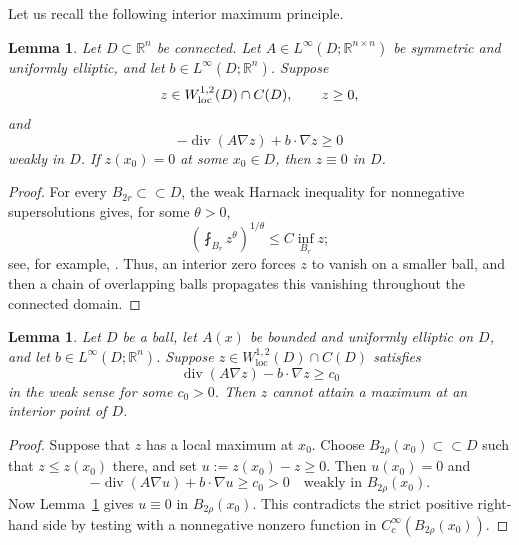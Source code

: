\documentclass[reqno,12pt]{amsart}
\numberwithin{equation}{section}
\newtheorem{lem}[thm]{Lemma}
\theoremstyle{remark}
\newcommand{\R}{\mathbb R}
\newcommand{\loc}{\mathrm{loc}}
\begin{document}
Let us recall the following interior maximum principle. 

\begin{lem}
\label{lem:linear-weak-harnack-minimum}
Let $D\subset\mathbb R^n$ be connected. Let
$A\in L^\infty(D;\mathbb R^{n\times n})$ be symmetric and uniformly elliptic, and let $b\in L^\infty(D;\mathbb R^n)$. Suppose
$$
z\in W^{1,2}_{\rm loc}(D)\cap C(D), \qquad z\ge0,
$$
and
$$
-\operatorname{div}(A\nabla z)+b\cdot\nabla z\ge0
$$
weakly in $D$. If $z(x_0)=0$ at some $x_0\in D$, then
$z\equiv0$ in $D$.
\end{lem}

\begin{proof}
For every $B_{2r}\subset \subset D$, the weak Harnack inequality for
nonnegative supersolutions gives, for some $\theta>0$,
$$
\left(\fint_{B_r}z^\theta\right)^{1/\theta}
\le C\inf_{B_r}z;
$$
see, for example, \cite[Theorems~8.18 and~8.19]{GT2001}.
Thus, an interior zero  forces $z$ to vanish on a smaller ball, and then a chain of overlapping balls propagates this vanishing throughout the connected domain.
\end{proof}


\begin{lem} \label{lem:maximum-exclusion}
Let $D$ be a ball, let $A(x)$ be bounded and uniformly elliptic on $D$, and let $b\in L^\infty(D;\R^n)$.  Suppose
$z\in W^{1,2}_{\loc}(D)\cap C(D)$ satisfies
\begin{equation}\label{eq:strict-subsolution-maximum}
\operatorname{div}(A\nabla z)-b\cdot\nabla z
\ge c_0
\end{equation}
in the weak sense for some $c_0>0$.  Then $z$ cannot attain a maximum at an interior point of $D$.
\end{lem}

\begin{proof}
Suppose that $z$ has a local maximum at $x_0$. Choose
$B_{2\rho}(x_0)\subset \subset D$ such that $z\le z(x_0)$ there, and set
$u:=z(x_0)-z\ge0.$
Then $u(x_0)=0$ and
$$
-\operatorname{div}(A\nabla u)+b\cdot\nabla u\ge c_0>0
\quad\text{weakly in }B_{2\rho}(x_0).
$$
Now Lemma~\ref{lem:linear-weak-harnack-minimum} gives
$u\equiv0$ in $B_{2\rho}(x_0)$. This contradicts the strict positive right-hand side by testing with a nonnegative nonzero function in $C_c^\infty(B_{2\rho}(x_0))$.
\end{proof}
\end{document}
